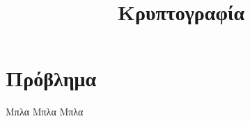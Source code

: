 \documentclass[a4paper, 11pt]{article}
\title{Κρυπτογραφία}
\author{\AuthorName}
\begin{document}
\maketitle
\section{Πρόβλημα}
Μπλα Μπλα Μπλα
\end{document}
